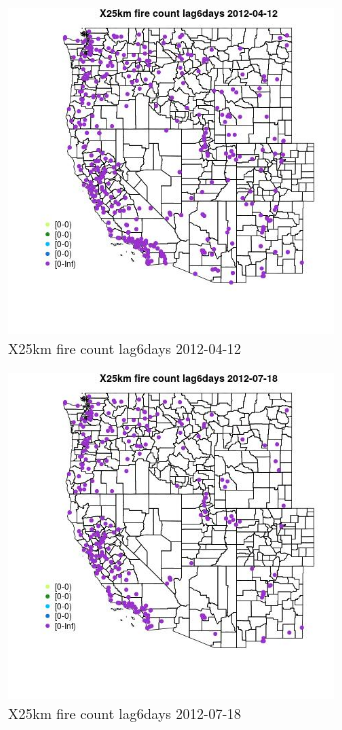 \begin{figure} 
\centering  
\includegraphics[width=0.77\textwidth]{Code_Outputs/Report_ML_input_PM25_Step4_part_e_de_duplicated_aves_compiled_2019-05-14wNAs_MapObsX25km_fire_count_lag6days2012-04-12.jpg} 
\caption{\label{fig:Report_ML_input_PM25_Step4_part_e_de_duplicated_aves_compiled_2019-05-14wNAsMapObsX25km_fire_count_lag6days2012-04-12}X25km fire count lag6days 2012-04-12} 
\end{figure} 
 

\begin{figure} 
\centering  
\includegraphics[width=0.77\textwidth]{Code_Outputs/Report_ML_input_PM25_Step4_part_e_de_duplicated_aves_compiled_2019-05-14wNAs_MapObsX25km_fire_count_lag6days2012-07-18.jpg} 
\caption{\label{fig:Report_ML_input_PM25_Step4_part_e_de_duplicated_aves_compiled_2019-05-14wNAsMapObsX25km_fire_count_lag6days2012-07-18}X25km fire count lag6days 2012-07-18} 
\end{figure} 
 

